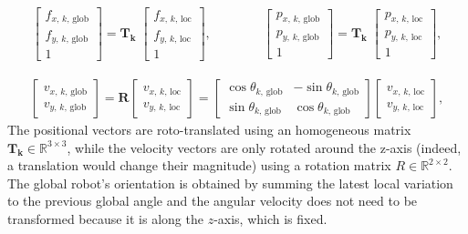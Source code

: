 \begin{align}
    \begin{bmatrix}
        f_{x,\,k,\,\text{glob} } \\
        f_{y,\,k,\,\text{glob}} \\[1ex]
        1
    \end{bmatrix}
    = \mathbf{T_k} \;
    \begin{bmatrix}
        f_{x,\,k,\,\text{loc} } \\
        f_{y,\,k,\,\text{loc}} \\[1ex]
        1
    \end{bmatrix},\qquad \qquad
    \begin{bmatrix}
        p_{x,\,k,\,\text{glob} } \\
        p_{y,\,k,\,\text{glob}} \\[1ex]
        1
    \end{bmatrix}
    = \mathbf{T_k} \;
    \begin{bmatrix}
        p_{x,\,k,\,\text{loc} } \\
        p_{y,\,k,\,\text{loc}} \\[1ex]
        1
    \end{bmatrix},
\end{align}

\begin{align}
    \begin{bmatrix}
        v_{x,\,k,\,\text{glob} } \\[1ex]
        v_{y,\,k,\,\text{glob}}
    \end{bmatrix}
    = \mathbf{R} 
    \begin{bmatrix}
        v_{x,\,k,\,\text{loc} } \\[1ex]
        v_{y,\,k,\,\text{loc}}
    \end{bmatrix}
    =
    \begin{bmatrix}
        \cos\theta_{k,\, \text{glob}} & -\sin\theta_{k,\, \text{glob}} \\[1ex]
        \sin\theta_{k,\, \text{glob}} & \cos\theta_{k,\, \text{glob}}
    \end{bmatrix}
    \begin{bmatrix}
        v_{x,\,k,\,\text{loc} } \\[1ex]
        v_{y,\,k,\,\text{loc}}
    \end{bmatrix},
\end{align}
The positional vectors are roto-translated using an homogeneous matrix $ \mathbf{T_k} \in \mathbb{R}^{3\times3}$, while the velocity vectors are only rotated around the z-axis (indeed, a translation would change their magnitude) using a rotation matrix $R \in \mathbb{R}^{2\times2}$.\\
The global robot's orientation is obtained by summing the latest local variation to the previous global angle and the angular velocity does not need to be transformed because it is along the $z$-axis, which is fixed.

